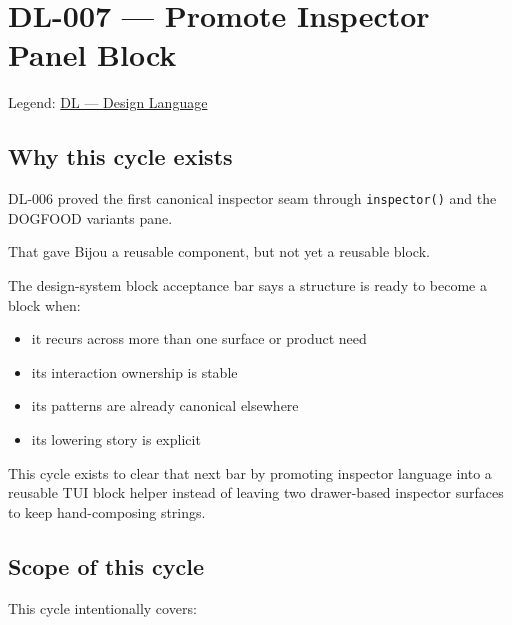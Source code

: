 \chapter{DL-007 --- Promote Inspector Panel Block}\label{record-174}

\smallskip

Legend: \href{https://github.com/flyingrobots/bijou/blob/1853ad902f6bf219326409e7f743a5a1d6517dbc/docs/legends/DL-design-language.md}{DL --- Design Language}

\section{Why this cycle exists}\label{record-174-why-this-cycle-exists}

DL-006 proved the first canonical inspector seam through \texttt{i\allowbreak{}n\allowbreak{}s\allowbreak{}p\allowbreak{}e\allowbreak{}c\allowbreak{}t\allowbreak{}o\allowbreak{}r\allowbreak{}(\allowbreak{})} and the DOGFOOD variants pane.

That gave Bijou a reusable component, but not yet a reusable block.

The design-system block acceptance bar says a structure is ready to become a block when:

\begin{itemize}
\tightlist
\item
  it recurs across more than one surface or product need
\item
  its interaction ownership is stable
\item
  its patterns are already canonical elsewhere
\item
  its lowering story is explicit
\end{itemize}

This cycle exists to clear that next bar by promoting inspector language into a reusable TUI block helper instead of leaving two drawer-based inspector surfaces to keep hand-composing strings.

\section{Scope of this cycle}\label{record-174-scope-of-this-cycle}

This cycle intentionally covers:

